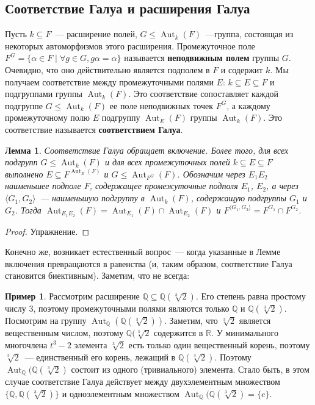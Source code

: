 \documentclass[a4paper,11pt]{scrartcl}
\theoremstyle{plain}
\newtheorem{lemma}[theorem]{Лемма}
\theoremstyle{definition}
\newtheorem{example}[theorem]{Пример}
\newcommand\dfn[1]{\textbf{#1}}
\newcommand\mb{\mathbb}
\newcommand\sseq{\subseteq}
\newcommand\Aut{\operatorname{Aut}}
\begin{document}
\subsection{Соответствие Галуа и расширения Галуа}

Пусть $k\sseq F$~--- расширение полей, $G\leq\Aut_k(F)$~---группа,
состоящая из некоторых автоморфизмов этого расширения. Промежуточное
поле
$F^G=\{\alpha\in F\mid\forall g\in G, g\alpha=\alpha\}$ называется 
\dfn{неподвижным полем} группы $G$. Очевидно, что оно действительно
является подполем в $F$ и содержит $k$. Мы получаем соответствие между
промежуточными полями $E$: $k\sseq E\sseq F$ и подгруппами группы
$\Aut_k(F)$. Это соответствие сопоставляет каждой подгруппе
$G\leq\Aut_k(F)$ ее поле неподвижных точек $F^G$, а каждому
промежуточному полю $E$ подгруппу $\Aut_E(F)$ группы $\Aut_k(F)$.
Это соответствие называется \dfn{соответствием Галуа}.

\begin{lemma}\label{lemma_corr_galois}
Соответствие Галуа обращает включение. Более того, для всех подгрупп
$G\leq\Aut_k(F)$ и для всех промежуточных полей $k\sseq E\sseq F$
выполнено $E\sseq F^{\Aut_E(F)}$ и $G\leq\Aut_{F^G}(F)$.
Обозначим через $E_1E_2$ наименьшее подполе $F$, содержащее
промежуточные подполя $E_1$, $E_2$, а через $\langle
G_1,G_2\rangle$~--- наименьшую подгруппу в $\Aut_k(F)$, содержащую
подгруппы $G_1$ и $G_2$. Тогда
$\Aut_{E_1E_2}(F)=\Aut_{E_1}(F)\cap\Aut_{E_2}(F)$ и $F^{\langle
  G_1,G_2\rangle}=F^{G_1}\cap F^{G_2}$.
\end{lemma}

\begin{proof}
Упражнение.
\end{proof}

Конечно же, возникает естественный вопрос~--- когда указанные в Лемме
включения превращаются в равенства (и, таким образом, соответствие
Галуа становится биективным). Заметим, что не всегда:
\begin{example}
Рассмотрим расширение $\mathbb Q\sseq \mathbb Q(\sqrt[3]{2})$. Его
степень равна простому числу $3$, поэтому промежуточными полями
являются только $\mathbb Q$ и $\mathbb Q(\sqrt[3]{2})$. Посмотрим на
группу $\Aut_{\mathbb Q}(\mathbb Q(\sqrt[3]{2}))$. Заметим, что
$\sqrt[3]{2}$ является вещественным числом, поэтому $\mb
Q(\sqrt[3]{2}$ содержится в $\mb R$. У минимального многочлена $t^3-2$
элемента $\sqrt[3]{2}$ есть только один вещественный корень, поэтому
$\sqrt[3]{2}$~--- единственный его корень, лежащий в $\mb
Q(\sqrt[3]{2})$. Поэтому $\Aut_{\mb Q}(\mb Q(\sqrt[3]{2})$ состоит из
одного (тривиального) элемента. Стало быть, в этом случае соответствие
Галуа действует между двухэлементным множеством $\{\mb Q,\mb
Q(\sqrt[3]{2})\}$ и одноэлементным множеством $\Aut_{\mb Q}(\mb
Q(\sqrt[3]{2})=\{e\}$.
\end{example}
\end{document}
